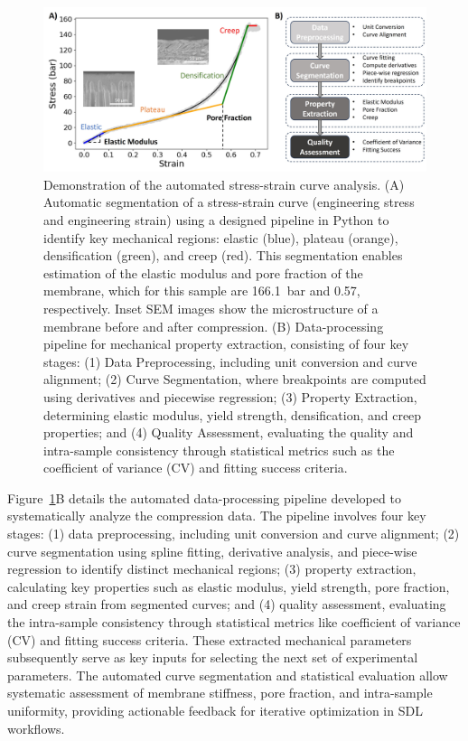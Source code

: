 \documentclass[preprint,12pt,times]{elsarticle}
\begin{document}
\begin{figure}[!ht]
\centering
\includegraphics[width=\linewidth]{Data processing.jpg}
\caption{Demonstration of the automated stress-strain curve analysis. (A) Automatic segmentation of a stress-strain curve (engineering stress and engineering strain) using a designed pipeline in Python to identify key mechanical regions: elastic (blue), plateau (orange), densification (green), and creep (red). This segmentation enables estimation of the elastic modulus and pore fraction of the membrane, which for this sample are 166.1~bar and 0.57, respectively. Inset SEM images show the microstructure of a membrane before and after compression. (B) Data-processing pipeline for mechanical property extraction, consisting of four key stages: (1) Data Preprocessing, including unit conversion and curve alignment; (2) Curve Segmentation, where breakpoints are computed using derivatives and piecewise regression; (3) Property Extraction, determining elastic modulus, yield strength, densification, and creep properties; and (4) Quality Assessment, evaluating the quality and intra-sample consistency through statistical metrics such as the coefficient of variance (CV) and fitting success criteria.}
\label{Data processing.jpg}
\end{figure}


Figure~\ref{Data processing.jpg}B details the automated data-processing pipeline developed to systematically analyze the compression data. The pipeline involves four key stages: (1) data preprocessing, including unit conversion and curve alignment; (2) curve segmentation using spline fitting, derivative analysis, and piece-wise regression to identify distinct mechanical regions; (3) property extraction, calculating key properties such as elastic modulus, yield strength, pore fraction, and creep strain from segmented curves; and (4) quality assessment, evaluating the intra-sample consistency through statistical metrics like coefficient of variance (CV) and fitting success criteria. These extracted mechanical parameters subsequently serve as key inputs for selecting the next set of experimental parameters. The automated curve segmentation and statistical evaluation allow systematic assessment of membrane stiffness, pore fraction, and intra-sample uniformity, providing actionable feedback for iterative optimization in SDL workflows.  
\end{document}

